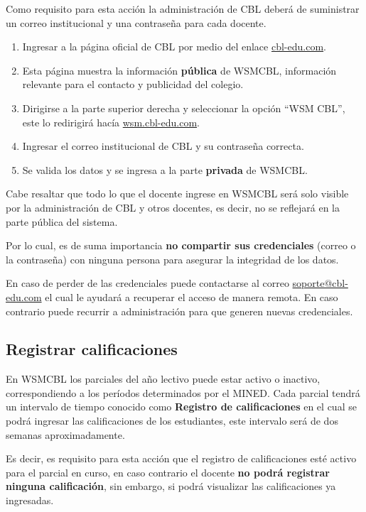 \documentclass[12pt]{article}
\begin{document}
    Como requisito para esta acción la administración de CBL deberá de suministrar un correo institucional y una contraseña para cada docente.

    \begin{enumerate}
        \item Ingresar a la página oficial de CBL por medio del enlace \href{www.cbl-edu.com}{cbl-edu.com}.
        \item Esta página muestra la información \textbf{pública} de WSMCBL, información relevante para el contacto y publicidad del colegio.
        \item Dirigirse a la parte superior derecha y seleccionar la opción ``WSM CBL'', este lo redirigirá hacía \href{wsm.cbl-edu.com}{wsm.cbl-edu.com}.
        \item Ingresar el correo institucional de CBL y su contraseña correcta.
        \item Se valida los datos y se ingresa a la parte \textbf{privada} de WSMCBL.
    \end{enumerate}

    Cabe resaltar que todo lo que el docente ingrese en WSMCBL será solo visible por la administración de CBL y otros docentes,
    es decir, no se reflejará en la parte pública del sistema.

    Por lo cual, es de suma importancia \textbf{no compartir sus credenciales} (correo o la contraseña) con ninguna persona para asegurar la integridad de los datos.

    En caso de perder de las credenciales puede contactarse al correo
    \href{mailto:soporte@cbl-edu.com}{soporte@cbl-edu.com}
    el cual le ayudará a recuperar el acceso de manera remota.
    En caso contrario puede recurrir a administración para que generen nuevas credenciales.


    \subsection{Registrar calificaciones}

    En WSMCBL los parciales del año lectivo puede estar activo o inactivo, correspondiendo a los períodos determinados por el MINED.
    Cada parcial tendrá un intervalo de tiempo conocido como \textbf{Registro de calificaciones} en el cual se podrá
    ingresar las calificaciones de los estudiantes, este intervalo será de dos semanas aproximadamente.

    Es decir, es requisito para esta acción que el registro de calificaciones esté activo para el parcial en curso,
    en caso contrario el docente \textbf{no podrá registrar ninguna calificación}, sin embargo, si podrá visualizar las calificaciones ya ingresadas.
\end{document}
